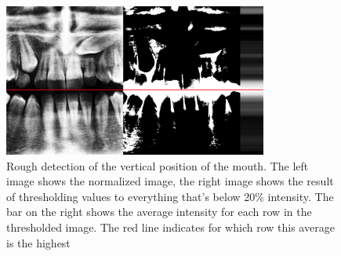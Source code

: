 \documentclass[a4paper,10pt]{article}
\begin{document}
\begin{figure}[h]
\centering
\includegraphics[height=50mm]{mouth_vis.png}
 \caption{Rough detection of the vertical position of the mouth. The left image shows the normalized image, the right image shows the result of thresholding values to everything that's below 20\% intensity. The bar on the right shows the average intensity for each row in the thresholded image. The red line indicates for which row this average is the highest}
\end{figure}
\end{document}
